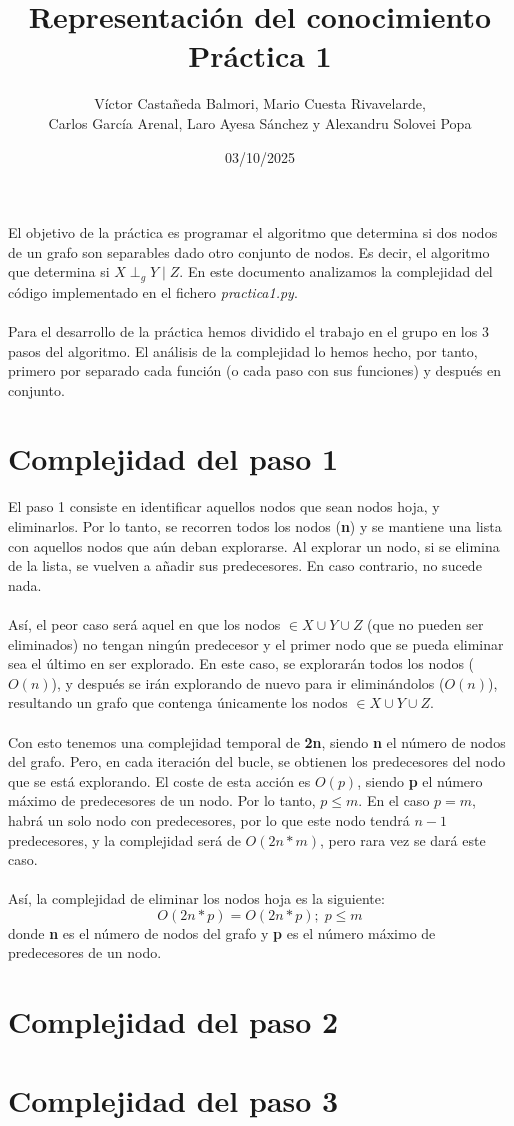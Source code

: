 \documentclass[a4paper,12pt]{article}
\title{Representación del conocimiento \\ Práctica 1}
\author{Víctor Castañeda Balmori, Mario Cuesta Rivavelarde, \\
Carlos García Arenal, Laro Ayesa Sánchez y Alexandru Solovei Popa}
\date{03/10/2025}
\begin{document}
\maketitle
\thispagestyle{fancy}
El objetivo de la práctica es programar el algoritmo que determina si dos nodos de un grafo son separables dado otro conjunto de nodos. Es decir, el algoritmo que determina si $X \perp _g Y \mid Z$. En este documento analizamos la complejidad del código implementado en el fichero \textit{practica1.py}. \\ \\
Para el desarrollo de la práctica hemos dividido el trabajo en el grupo en los 3 pasos del algoritmo. El análisis de la complejidad lo hemos hecho, por tanto, primero por separado cada función (o cada paso con sus funciones) y después en conjunto.

\section{Complejidad del paso 1}

El paso 1 consiste en identificar aquellos nodos que sean nodos hoja, y eliminarlos. Por lo tanto, se recorren todos los nodos (\textbf{n}) y se mantiene una lista con aquellos nodos que aún deban explorarse. Al explorar un nodo, si se elimina de la lista, se vuelven a añadir sus predecesores. En caso contrario, no sucede nada. \\ \\
Así, el peor caso será aquel en que los nodos $\in X \cup Y \cup Z$ (que no pueden ser eliminados) no tengan ningún predecesor y el primer nodo que se pueda eliminar sea el último en ser explorado. En este caso, se explorarán todos los nodos ($O(n)$), y después se irán explorando de nuevo para ir eliminándolos ($O(n)$), resultando un grafo que contenga únicamente los nodos $\in X \cup Y \cup Z$. \\ \\
Con esto tenemos una complejidad temporal de \textbf{2n}, siendo \textbf{n} el número de nodos del grafo. Pero, en cada iteración del bucle, se obtienen los predecesores del nodo que se está explorando. El coste de esta acción es $O(p)$, siendo \textbf{p} el número máximo de predecesores de un nodo. Por lo tanto, $p \le m$. En el caso $p = m$, habrá un solo nodo con predecesores, por lo que este nodo tendrá $n - 1$ predecesores, y la complejidad será de $O(2n*m)$, pero rara vez se dará este caso. \\ \\
Así, la complejidad de eliminar los nodos hoja es la siguiente:
$$O(2n*p) = O(2n*p); \; p \le m$$
donde \textbf{n} es el número de nodos del grafo y \textbf{p} es el número máximo de predecesores de un nodo.

\section{Complejidad del paso 2}

\section{Complejidad del paso 3}
\end{document}
